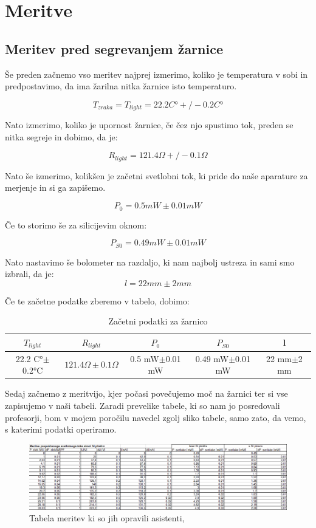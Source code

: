 \documentclass[11pt, a4paper]{article}
\theoremstyle{definition}
\theoremstyle{example}
\theoremstyle{izrek}
\begin{document}
\section{Meritve}
\subsection{Meritev pred segrevanjem žarnice}
Še preden začnemo vso meritev najprej izmerimo, koliko je temperatura v sobi in predpostavimo, da ima žarilna nitka žarnice isto temperaturo.

$$T_{zraka}=T_{light}=22.2 C°+/- 0.2C° $$

Nato izmerimo, koliko je upornost žarnice, če čez njo spustimo tok, preden se nitka segreje in dobimo, da je: 

$$R_{light}=121.4 \Omega +/- 0.1 \Omega $$

Nato še izmerimo, kolikšen je začetni svetlobni tok, ki pride do naše aparature za merjenje in si ga zapišemo.

$$P_0=0.5 mW \pm 0.01 mW$$
 
Če to storimo še za silicijevim oknom:
 
$$P_{S0}=0.49 mW \pm 0.01 mW$$

Nato nastavimo še bolometer na razdaljo, ki nam najbolj ustreza in sami smo izbrali, da je: 
$$l=22 mm \pm 2 mm$$

\pagebreak
Če te začetne podatke zberemo v tabelo, dobimo:
\begin{table}[h]

	\begin{tabular}{|c|c|c|c|c|}
		\hline
		\hline
		$T_{light}$ & $R_{light}$ & $P_0$ & $P_{S0}$ & l \\
		\hline
		22.2 C°$\pm$0.2°C & $121.4 \Omega \pm 0.1 \Omega$ & 0.5 mW$\pm$0.01 mW & 0.49 mW$\pm$0.01 mW & 22 mm$\pm$2 mm \\
		\hline
	\end{tabular}
	\caption{Začetni podatki za žarnico}		\label{osnove}
\end{table}

Sedaj začnemo z meritvijo, kjer počasi povečujemo moč na žarnici ter si vse zapisujemo v naši tabeli.
Zaradi prevelike tabele, ki so nam jo posredovali profesorji, bom v mojem poročilu navedel zgolj sliko tabele, samo zato, da vemo, s katerimi podatki operiramo. 

\begin{figure}[htp]
    \includegraphics[width=15cm]{Tabela.png}
    \caption{Tabela meritev ki so jih opravili asistenti,}
\end{figure}
\end{document}
